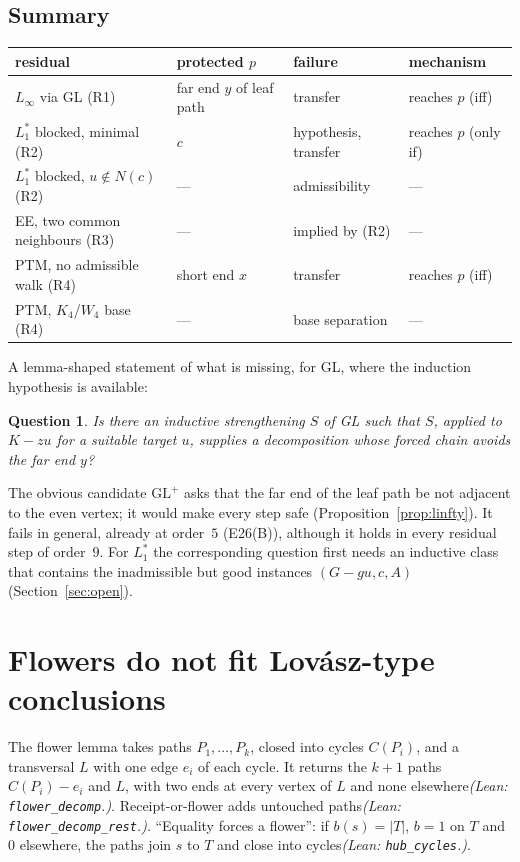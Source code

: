 \documentclass[11pt]{amsart}
\newtheorem{question}[theorem]{Question}
\theoremstyle{definition}
\newcommand{\lean}[1]{\quad\emph{(Lean: \texttt{#1}.)}}
\begin{document}
\subsection{Summary}
\begin{center}\footnotesize
\begin{tabular}{@{}llll@{}}
\toprule
residual & protected $p$ & failure & mechanism\\
\midrule
$L_\infty$ via GL (R1) & far end $y$ of leaf path & transfer & reaches $p$ (iff)\\
$L_1^*$ blocked, minimal (R2) & $c$ & hypothesis, transfer & reaches $p$ (only if)\\
$L_1^*$ blocked, $u\notin N(c)$ (R2) & --- & admissibility & ---\\
EE, two common neighbours (R3) & --- & implied by (R2) & ---\\
PTM, no admissible walk (R4) & short end $x$ & transfer & reaches $p$ (iff)\\
PTM, $K_4$/$W_4$ base (R4) & --- & base separation & ---\\
\bottomrule
\end{tabular}
\end{center}

A lemma-shaped statement of what is missing, for GL, where the induction hypothesis is available:
\begin{question}\label{q:tight}
Is there an inductive strengthening $S$ of GL such that $S$, applied to $K-zu$ for a suitable target
$u$, supplies a decomposition whose forced chain avoids the far end $y$?
\end{question}
The obvious candidate $\mathrm{GL}^+$ asks that the far end of the leaf path be not adjacent to the
even vertex; it would make every step safe (Proposition~\ref{prop:linfty}). It fails in general,
already at order~$5$ (E26(B)), although it holds in every residual step of order~$9$. For $L_1^*$ the
corresponding question first needs an inductive class that contains the inadmissible but good
instances $(G-gu,c,A)$ (Section~\ref{sec:open}).

\section{Flowers do not fit Lov\'asz-type conclusions}\label{sec:flower}

The flower lemma \cite[\S7]{ES} takes paths $P_1,\dots,P_k$, closed into cycles $C(P_i)$, and a
transversal $L$ with one edge $e_i$ of each cycle. It returns the $k+1$ paths $C(P_i)-e_i$ and $L$,
with two ends at every vertex of $L$ and none elsewhere\lean{flower\_decomp}. Receipt-or-flower adds
untouched paths\lean{flower\_decomp\_rest}. ``Equality forces a flower'': if $b(s)=|T|$, $b=1$ on $T$
and $0$ elsewhere, the paths join $s$ to $T$ and close into cycles\lean{hub\_cycles}.
\end{document}
